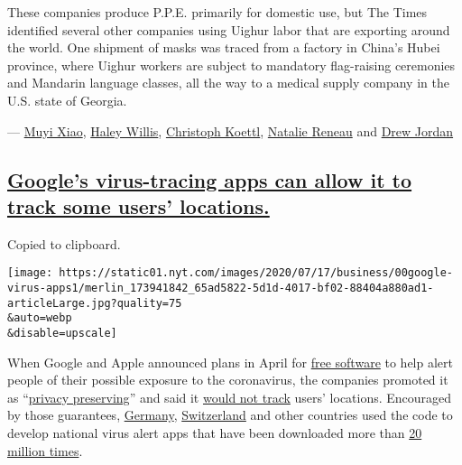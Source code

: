 These companies produce P.P.E. primarily for domestic use, but The Times
identified several other companies using Uighur labor that are exporting
around the world. One shipment of masks was traced from a factory in
China's Hubei province, where Uighur workers are subject to mandatory
flag-raising ceremonies and Mandarin language classes, all the way to a
medical supply company in the U.S. state of Georgia.

--- \href{https://www.nytimes.com/by/muyi-xiao}{Muyi Xiao},
\href{https://www.nytimes.com/by/haley-willis}{Haley Willis},
\href{https://www.nytimes.com/by/christoph-koettl}{Christoph Koettl},
\href{https://www.nytimes.com/by/natalie-reneau}{Natalie Reneau} and
\href{https://www.nytimes.com/by/drew-jordan}{Drew Jordan}

\hypertarget{googles-virus-tracing-apps-can-allow-it-to-track-some-users-locations}{%
\subsection{\texorpdfstring{\protect\hyperlink{googles-virus-tracing-apps-can-allow-it-to-track-some-users-locations}{Google's
virus-tracing apps can allow it to track some users'
locations.}}{Google's virus-tracing apps can allow it to track some users' locations.}}\label{googles-virus-tracing-apps-can-allow-it-to-track-some-users-locations}}

Copied to clipboard.

\texttt{[image: https://static01.nyt.com/images/2020/07/17/business/00google-virus-apps1/merlin\_173941842\_65ad5822-5d1d-4017-bf02-88404a880ad1-articleLarge.jpg?quality=75\\\&auto=webp\\\&disable=upscale]}

When Google and Apple announced plans in April for
\href{https://www.nytimes.com/2020/04/10/technology/apple-google-coronavirus-contact-tracing.html}{free
software} to help alert people of their possible exposure to the
coronavirus, the companies promoted it as
``\href{https://www.apple.com/covid19/contacttracing}{privacy
preserving}'' and said it
\href{https://covid19-static.cdn-apple.com/applications/covid19/current/static/contact-tracing/pdf/ExposureNotification-FAQv1.1.pdf}{would
not track} users' locations. Encouraged by those guarantees,
\href{https://play.google.com/store/apps/details?id=de.rki.coronawarnapp}{Germany},
\href{https://www.thelocal.ch/20200609/how-will-switzerlands-coronavirus-tracing-app-work}{Switzerland}
and other countries used the code to develop national virus alert apps
that have been downloaded more than
\href{https://www.zdnet.com/article/germanys-contact-tracing-app-gets-downloaded-6-5-million-times-in-a-day/}{20
million times}.

